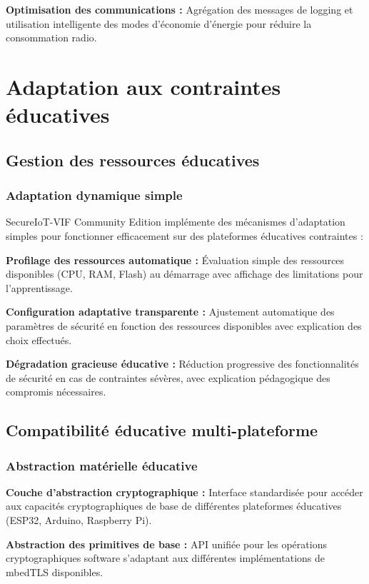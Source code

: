 \begin{algorithm}
\textbf{Optimisation des communications :} Agrégation des messages de logging et utilisation intelligente des modes d'économie d'énergie pour réduire la consommation radio.

\section{Adaptation aux contraintes éducatives}

\subsection{Gestion des ressources éducatives}

\subsubsection{Adaptation dynamique simple}

SecureIoT-VIF Community Edition implémente des mécanismes d'adaptation simples pour fonctionner efficacement sur des plateformes éducatives contraintes :

\textbf{Profilage des ressources automatique :} Évaluation simple des ressources disponibles (CPU, RAM, Flash) au démarrage avec affichage des limitations pour l'apprentissage.

\textbf{Configuration adaptative transparente :} Ajustement automatique des paramètres de sécurité en fonction des ressources disponibles avec explication des choix effectués.

\textbf{Dégradation gracieuse éducative :} Réduction progressive des fonctionnalités de sécurité en cas de contraintes sévères, avec explication pédagogique des compromis nécessaires.

\subsection{Compatibilité éducative multi-plateforme}

\subsubsection{Abstraction matérielle éducative}

\textbf{Couche d'abstraction cryptographique :} Interface standardisée pour accéder aux capacités cryptographiques de base de différentes plateformes éducatives (ESP32, Arduino, Raspberry Pi).

\textbf{Abstraction des primitives de base :} API unifiée pour les opérations cryptographiques software s'adaptant aux différentes implémentations de mbedTLS disponibles.


\end{algorithm}
